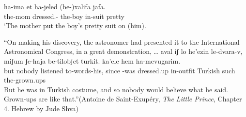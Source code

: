 \begin{exe}
\begin{xlist}
\begin{xlist}
\begin{exe}
\begin{exe}
\begin{xlist}
\begin{exe}
\begin{xlist}
\begin{exe}
\begin{xlist}
\begin{xlist}
\begin{exe}
\begin{xlist}
\begin{exe}
\begin{xlist}
\begin{exe}
\begin{xlist}
\begin{exe}
\begin{exe}
\begin{exe}
\begin{xlist}
\begin{exe}
\begin{exe}
\begin{xlist}
\begin{xlist}
\begin{exe}
\begin{xlist}
\begin{exe}
\begin{exe}
\begin{xlist}
\begin{exe}
\begin{exe}
\begin{xlist}
\begin{exe}
\begin{xlist}
\begin{exe}
\begin{xlist}
\begin{exe}
\begin{xlist}
\begin{exe}
\begin{exe}
\begin{xlist}
\begin{exe}
\begin{exe}
\begin{xlist}
\begin{xlist}
\begin{exe}
\begin{xlist}
\begin{xlist}
\begin{exe}
\begin{xlist}
\begin{exe}
\begin{xlist}
\begin{exe}
\begin{xlist}
\begin{exe}
\begin{xlist}
\begin{exe}
\begin{exe}
\begin{exe}
\begin{exe}
\begin{xlist}
\begin{exe}
\begin{exe}
\begin{xlist}
\begin{xlist}
\begin{exe}
\begin{exe}
\begin{xlist}
\begin{exe}
\begin{xlist}
\begin{exe}
\begin{xlist}
\begin{exe}
\begin{xlist}
\begin{exe}
\begin{xlist}
\begin{exe}
\begin{exe}
\begin{exe}
\begin{exe}
\begin{xlist}
 \begin{exe}
 \ex  
 \begin{xlist} 
 	\ex   
 		{ \gll ha-ima  et ha-jeled (be-)xalifa jafa.\\
 		  the-mom dressed.-  the-boy in-suit pretty\\
 		\glt `The mother put the boy's pretty suit on (him). } 
		
	
 	\ex  ``On making his discovery, the astronomer had presented it to the International Astronomical Congress, in a great demonstration, \dots 	
 		{ \gll aval iʃ lo he'ezin le-dvara-v, miʃum ʃe-haja  be-tilobʃet turkit. ka'ele hem ha-mevugarim.\\
 		  but nobody  listened to-words-his, since -was dressed.up in-outfit Turkish such  the-grown.ups\\
 		\glt But he was in Turkish costume, and so nobody would believe what he said. Grown-ups are like that.''\hfill {(Antoine de Saint-Exup\'ery, \emph{The Little Prince}, Chapter 4. Hebrew by Jude Shva\footnotemark)} } 
	
 \z
\z 


\end{xlist}
\end{exe}
\end{xlist}
\end{exe}
\end{exe}
\end{exe}
\end{exe}
\end{xlist}
\end{exe}
\end{xlist}
\end{exe}
\end{xlist}
\end{exe}
\end{xlist}
\end{exe}
\end{xlist}
\end{exe}
\end{exe}
\end{xlist}
\end{xlist}
\end{exe}
\end{exe}
\end{xlist}
\end{exe}
\end{exe}
\end{exe}
\end{exe}
\end{xlist}
\end{exe}
\end{xlist}
\end{exe}
\end{xlist}
\end{exe}
\end{xlist}
\end{exe}
\end{xlist}
\end{xlist}
\end{exe}
\end{xlist}
\end{xlist}
\end{exe}
\end{exe}
\end{xlist}
\end{exe}
\end{exe}
\end{xlist}
\end{exe}
\end{xlist}
\end{exe}
\end{xlist}
\end{exe}
\end{xlist}
\end{exe}
\end{exe}
\end{xlist}
\end{exe}
\end{exe}
\end{xlist}
\end{exe}
\end{xlist}
\end{xlist}
\end{exe}
\end{exe}
\end{xlist}
\end{exe}
\end{exe}
\end{exe}
\end{xlist}
\end{exe}
\end{xlist}
\end{exe}
\end{xlist}
\end{exe}
\end{xlist}
\end{xlist}
\end{exe}
\end{xlist}
\end{exe}
\end{xlist}
\end{exe}
\end{exe}
\end{xlist}
\end{xlist}
\end{exe}
